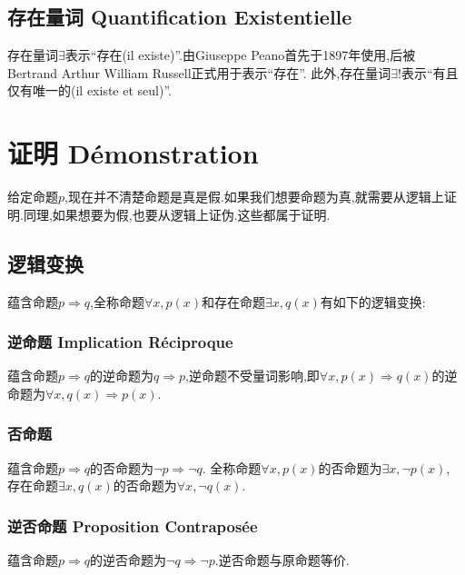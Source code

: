 \documentclass[12pt, a4paper, oneside]{ctexbook}
\begin{document}
  \subsection{存在量词 Quantification Existentielle}
  存在量词$\exists$表示“存在(il existe)”.由Giuseppe Peano首先于1897年使用,后被Bertrand Arthur William Russell正式用于表示“存在”.
  此外,存在量词$\exists !$表示“有且仅有唯一的(il existe et seul)”.


  \section{证明 Démonstration}
  给定命题$p$,现在并不清楚命题是真是假.如果我们想要命题为真,就需要从逻辑上证明.同理,如果想要为假,也要从逻辑上证伪.这些都属于证明.
  \subsection{逻辑变换}
  蕴含命题$p\Rightarrow q$,全称命题$\forall x,p(x)$和存在命题$\exists x,q(x)$有如下的逻辑变换:
  \subsubsection{逆命题 Implication Réciproque}
  蕴含命题$p\Rightarrow q$的逆命题为$q\Rightarrow p$,逆命题不受量词影响,即$\forall x,p(x)\Rightarrow q(x)$的逆命题为$\forall x,q(x)\Rightarrow p(x)$.
  \subsubsection{否命题 }
  蕴含命题$p\Rightarrow q$的否命题为$\lnot p\Rightarrow \lnot q$.
  全称命题$\forall x,p(x)$的否命题为$\exists x,\lnot p(x)$,
  存在命题$\exists x,q(x)$的否命题为$\forall x,\lnot q(x)$.
  \subsubsection{逆否命题 Proposition Contraposée}
  蕴含命题$p\Rightarrow q$的逆否命题为$\lnot q\Rightarrow \lnot p$.逆否命题与原命题等价.
  
\end{document}
